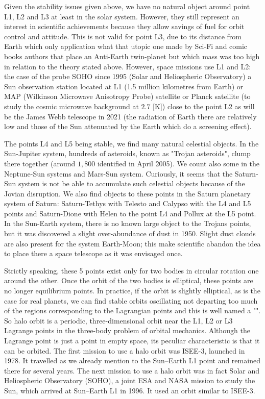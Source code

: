 	Given the stability issues given above, we have no natural object around point L1, L2 and L3 at least in the solar system. However, they still represent an interest in scientific achievements because they allow savings of fuel for orbit control and attitude. This is not valid for point L3, due to its distance from Earth which only application what that utopic one made by Sci-Fi and comic books authors that place an Anti-Earth twin-planet but which mass was too high in relation to the theory stated above. However, space missions use L1 and L2: the case of the probe SOHO since 1995 (Solar and Heliospheric Observatory) a Sun observation station located at L1 (1.5 million kilometres from Earth) or MAP (Wilkinson Microwave Anisotropy Probe) satellite or Planck satellite (to study the cosmic microwave background at $2.7$ [K]) close to the point L2 as will be the James Webb telescope in 2021 (the radiation of Earth there are relatively low and those of the Sun attenuated by the Earth which do a screening effect).
	
	The points L4 and L5 being stable, we find many natural celestial objects. In the Sun-Jupiter system, hundreds of asteroids, known as "Trojan asteroids", clump there together (around $1,800$ identified in April 2005). We count also  some in the Neptune-Sun systems and Mars-Sun system. Curiously, it seems that the Saturn-Sun system is not be able to accumulate such celestial objects because of the Jovian disruption. We also find objects to these points in the Saturn planetary system of Saturn: Saturn-Tethys with Telesto and Calypso with the L4 and L5 points and Saturn-Dione with Helen to the point L4 and Pollux at the L5 point. In the Sun-Earth system, there is no known large object to the Trojans points, but it was discovered a slight over-abundance of dust in 1950. Slight dust clouds are also present for the system Earth-Moon; this make scientific abandon the idea to place there a space telescope as it was envisaged once.
	
	Strictly speaking, these 5 points exist only for two bodies in circular rotation one around the other. Once the orbit of the two bodies is elliptical, these points are no longer equilibrium points. In practice, if the orbit is slightly elliptical, as is the case for real planets, we can find stable orbits oscillating not departing too much of the regions corresponding to the Lagrangian points and this is well named a "". So halo orbit is a periodic, three-dimensional orbit near the L1, L2 or L3 Lagrange points in the three-body problem of orbital mechanics. Although the Lagrange point is just a point in empty space, its peculiar characteristic is that it can be orbited. The first mission to use a halo orbit was ISEE-3, launched in 1978. It travelled as we already mention to the Sun–Earth L1 point and remained there for several years. The next mission to use a halo orbit was in fact Solar and Heliospheric Observatory (SOHO), a joint ESA and NASA mission to study the Sun, which arrived at Sun–Earth L1 in 1996. It used an orbit similar to ISEE-3.
	
